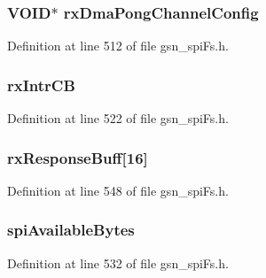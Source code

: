 \hypertarget{a00232_aa2733539030c490c8bc19d5ea2185f4a}{
\subsubsection[{rxDmaPongChannelConfig}]{\setlength{\rightskip}{0pt plus 5cm}VOID$\ast$ {\bf rxDmaPongChannelConfig}}}
\label{a00232_aa2733539030c490c8bc19d5ea2185f4a}


Definition at line 512 of file gsn\_\-spiFs.h.

\hypertarget{a00232_aec97c6dc1aa53452aa2e39aa1f1ff89f}{
\subsubsection[{rxIntrCB}]{ {\bf rxIntrCB}}}
\label{a00232_aec97c6dc1aa53452aa2e39aa1f1ff89f}


Definition at line 522 of file gsn\_\-spiFs.h.

\hypertarget{a00232_a23328d3d0e3aab44af0e3800694657d8}{
\subsubsection[{rxResponseBuff}]{ {\bf rxResponseBuff}\mbox{[}16\mbox{]}}}
\label{a00232_a23328d3d0e3aab44af0e3800694657d8}


Definition at line 548 of file gsn\_\-spiFs.h.

\hypertarget{a00232_aeb856d40bd458a2626a852d943ac6011}{
\subsubsection[{spiAvailableBytes}]{ {\bf spiAvailableBytes}}}
\label{a00232_aeb856d40bd458a2626a852d943ac6011}


Definition at line 532 of file gsn\_\-spiFs.h.

